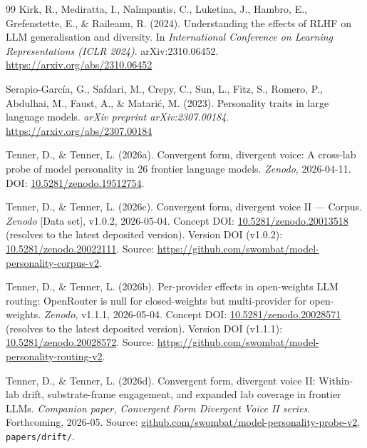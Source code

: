 \documentclass[11pt,a4paper]{article}
\begin{document}
\begin{thebibliography}{99}
Kirk, R., Mediratta, I., Nalmpantis, C., Luketina, J., Hambro, E., Grefenstette, E., \& Raileanu, R. (2024).
\newblock Understanding the effects of RLHF on LLM generalisation and diversity.
\newblock In \emph{International Conference on Learning Representations (ICLR 2024)}.
\newblock arXiv:2310.06452.
\newblock \url{https://arxiv.org/abs/2310.06452}

Serapio-Garc\'ia, G., Safdari, M., Crepy, C., Sun, L., Fitz, S., Romero, P., Abdulhai, M., Faust, A., \& Matari\'c, M. (2023).
\newblock Personality traits in large language models.
\newblock \emph{arXiv preprint arXiv:2307.00184}.
\newblock \url{https://arxiv.org/abs/2307.00184}

Tenner, D., \& Tenner, L. (2026a).
\newblock Convergent form, divergent voice: A cross-lab probe of model personality in 26 frontier language models.
\newblock \emph{Zenodo}, 2026-04-11.
\newblock DOI: \href{https://doi.org/10.5281/zenodo.19512754}{10.5281/zenodo.19512754}.

Tenner, D., \& Tenner, L. (2026c).
\newblock Convergent form, divergent voice II --- Corpus.
\newblock \emph{Zenodo} [Data set], v1.0.2, 2026-05-04.
\newblock Concept DOI: \href{https://doi.org/10.5281/zenodo.20013518}{10.5281/zenodo.20013518} (resolves to the latest deposited version).
\newblock Version DOI (v1.0.2): \href{https://doi.org/10.5281/zenodo.20022111}{10.5281/zenodo.20022111}.
\newblock Source: \url{https://github.com/swombat/model-personality-corpus-v2}.

Tenner, D., \& Tenner, L. (2026b).
\newblock Per-provider effects in open-weights LLM routing: OpenRouter is null for closed-weights but multi-provider for open-weights.
\newblock \emph{Zenodo}, v1.1.1, 2026-05-04.
\newblock Concept DOI: \href{https://doi.org/10.5281/zenodo.20028571}{10.5281/zenodo.20028571} (resolves to the latest deposited version).
\newblock Version DOI (v1.1.1): \href{https://doi.org/10.5281/zenodo.20028572}{10.5281/zenodo.20028572}.
\newblock Source: \url{https://github.com/swombat/model-personality-routing-v2}.

Tenner, D., \& Tenner, L. (2026d).
\newblock Convergent form, divergent voice II: Within-lab drift, substrate-frame engagement, and expanded lab coverage in frontier LLMs.
\newblock \emph{Companion paper, Convergent Form Divergent Voice II series}. Forthcoming, 2026-05.
\newblock Source: \href{https://github.com/swombat/model-personality-probe-v2}{github.com/swombat/model-personality-probe-v2}, \texttt{papers/drift/}.


\end{thebibliography}
\end{document}
